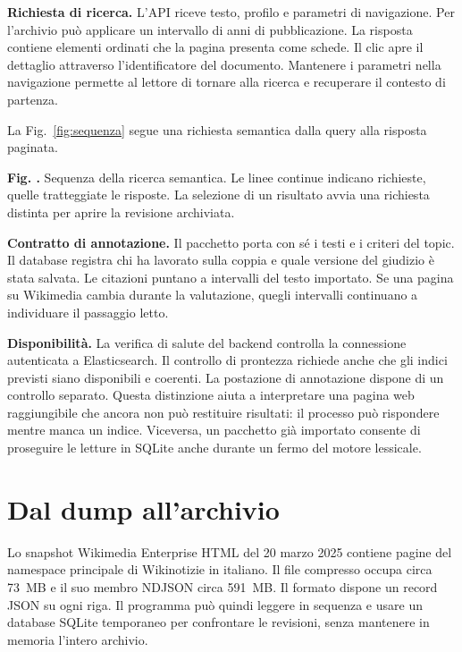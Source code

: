 \documentclass[11pt,a4paper]{article}
\newcommand{\legendnote}[2]{\refstepcounter{figure}\label{fig:#1}\par{\small\sffamily\color{ink}\textbf{Fig. \thefigure.} #2\par}}
\begin{document}
\textbf{Richiesta di ricerca.} L'API riceve testo, profilo e parametri di navigazione. Per l'archivio può applicare un intervallo di anni di pubblicazione. La risposta contiene elementi ordinati che la pagina presenta come schede. Il clic apre il dettaglio attraverso l'identificatore del documento. Mantenere i parametri nella navigazione permette al lettore di tornare alla ricerca e recuperare il contesto di partenza.

La Fig.~\ref{fig:sequenza} segue una richiesta semantica dalla query alla risposta paginata.


\legendnote{sequenza}{Sequenza della ricerca semantica. Le linee continue indicano richieste, quelle tratteggiate le risposte. La selezione di un risultato avvia una richiesta distinta per aprire la revisione archiviata.}

\textbf{Contratto di annotazione.} Il pacchetto porta con sé i testi e i criteri del topic. Il database registra chi ha lavorato sulla coppia e quale versione del giudizio è stata salvata. Le citazioni puntano a intervalli del testo importato. Se una pagina su Wikimedia cambia durante la valutazione, quegli intervalli continuano a individuare il passaggio letto.

\textbf{Disponibilità.} La verifica di salute del backend controlla la connessione autenticata a Elasticsearch. Il controllo di prontezza richiede anche che gli indici previsti siano disponibili e coerenti. La postazione di annotazione dispone di un controllo separato. Questa distinzione aiuta a interpretare una pagina web raggiungibile che ancora non può restituire risultati: il processo può rispondere mentre manca un indice. Viceversa, un pacchetto già importato consente di proseguire le letture in SQLite anche durante un fermo del motore lessicale.

\clearpage

\section{Dal dump all'archivio}\label{dal-dump-allarchivio}

Lo snapshot Wikimedia Enterprise HTML del 20 marzo 2025 contiene pagine del namespace principale di Wikinotizie in italiano. Il file compresso occupa circa 73~MB e il suo membro NDJSON circa 591~MB. Il formato dispone un record JSON su ogni riga. Il programma può quindi leggere in sequenza e usare un database SQLite temporaneo per confrontare le revisioni, senza mantenere in memoria l'intero archivio.
\end{document}
